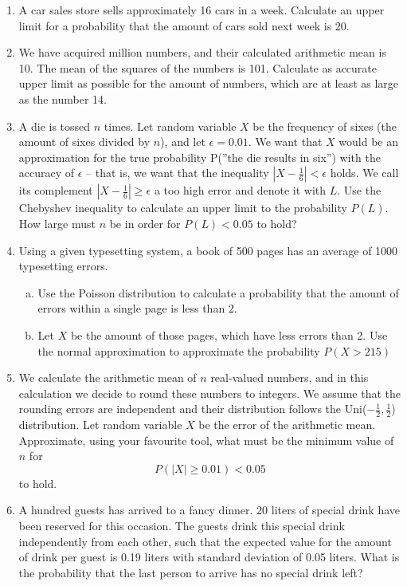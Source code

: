 \documentclass[12pt,a4paper,leqno]{report}
\theoremstyle{plain}
\theoremstyle{definition}
\begin{document}
\begin{enumerate}
\item A car sales store sells approximately 16 cars in a week. Calculate an upper limit for a probability that the amount of cars sold next week is 20.
\item We have acquired million numbers, and their calculated arithmetic mean is 10. The mean of the squares of the numbers is 101. Calculate as accurate upper limit as possible for the amount of numbers, which are at least as large as the number 14.
\item A die is tossed $n$ times. Let random variable $X$ be the frequency of sixes (the amount of sixes divided by $n$), and let $\epsilon = 0.01$. We want that $X$ would be an approximation for the true probability P(''the die results in six'') with the accuracy of $\epsilon$ -- that is, we want that the inequality $|X-\frac{1}{6}| < \epsilon$ holds. We call its complement $|X-\frac{1}{6}| \geq \epsilon$ a too high error and denote it with $L$. Use the Chebyshev inequality to calculate an upper limit to the probability $P(L)$. How large must $n$ be in order for $P(L) < 0.05$ to hold?
\item Using a given typesetting system, a book of 500 pages has an average of 1000 typesetting errors.
\begin{enumerate}[(a)]
\item Use the Poisson distribution to calculate a probability that the amount of errors within a single page is less than 2.
\item Let $X$ be the amount of those pages, which have less errors than 2. Use the normal approximation to approximate the probability $P(X > 215)$
\end{enumerate}
\item We calculate the arithmetic mean of $n$ real-valued numbers, and in this calculation we decide to round these numbers to integers. We assume that the rounding errors are independent and their distribution follows the Uni($-\frac{1}{2}, \frac{1}{2}$) distribution. Let random variable $X$ be the error of the arithmetic mean. Approximate, using your favourite tool, what must be the minimum value of $n$ for
\[
P(|X|\geq 0.01) < 0.05
\]
to hold.
\item A hundred guests has arrived to a fancy dinner. 20 liters of special drink have been reserved for this occasion. The guests drink this special drink independently from each other, such that the expected value for the amount of drink per guest is 0.19 liters with standard deviation of 0.05 liters. What is the probability that the last person to arrive has no special drink left?
\end{enumerate}
\end{document}
